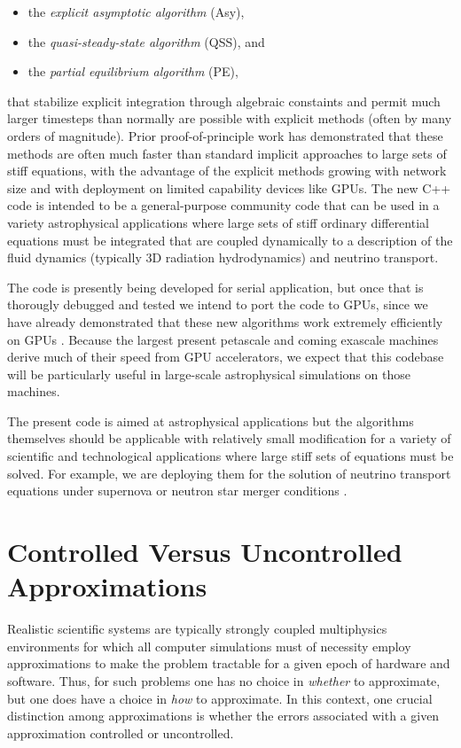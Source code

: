 \documentclass[11pt]{article}
\begin{document}
\begin{itemize}
 \item 
 the {\em explicit asymptotic algorithm} (Asy),
 \item
 the {\em quasi-steady-state algorithm} (QSS), and
 \item
 the {\em partial equilibrium algorithm} (PE),
\end{itemize}
that stabilize explicit integration through algebraic constaints
and permit much larger timesteps than
normally are possible with explicit methods  (often by many orders of 
magnitude). 
Prior proof-of-principle work has demonstrated that these methods are often 
much 
faster than standard implicit approaches to large sets of stiff equations, with 
the advantage of the explicit methods growing with network size and 
with deployment on limited capability devices like GPUs.
The new C++ code is intended to be a general-purpose community code that can be 
used in a variety astrophysical applications where large sets of stiff ordinary 
differential equations must be integrated that are coupled dynamically to a 
description of the fluid dynamics (typically 3D radiation hydrodynamics) and 
neutrino transport. 

The code is presently being developed for serial 
application, but once that is thorougly debugged and tested we intend to port 
the code to GPUs, since we 
have already demonstrated that these new algorithms work extremely efficiently 
 on GPUs \cite{brockJCP,haidar2016}.  Because the largest present 
petascale and coming exascale machines derive much of their speed from GPU 
accelerators, we expect that this codebase will be particularly useful in 
large-scale astrophysical simulations on those machines. 

The present 
code is aimed at astrophysical applications but the algorithms themselves 
should be 
applicable with relatively small modification for a variety of scientific and 
technological applications where large stiff sets of equations must be solved.
For example, we are deploying them for the solution of neutrino 
transport equations under supernova or neutron star merger conditions 
\cite{endeve20}.


\section{Controlled Versus Uncontrolled Approximations}

Realistic scientific systems are typically strongly coupled multiphysics 
environments for which
all computer simulations must of necessity 
employ approximations to make the problem tractable for a given epoch of 
hardware and software.  Thus, for such problems one has no choice in 
{\em whether} to approximate, but one does have a choice in {\em how} to 
approximate. In this context, one crucial distinction among approximations is 
whether the errors associated with a given approximation controlled or 
uncontrolled.
\end{document}
